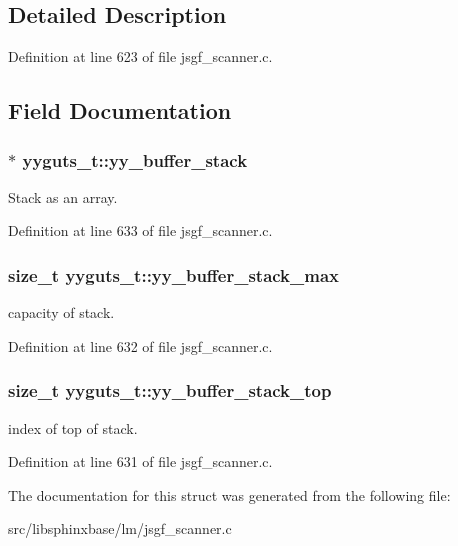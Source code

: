 \subsection{Detailed Description}


Definition at line 623 of file jsgf\-\_\-scanner.\-c.



\subsection{Field Documentation}
\subsubsection[{yy\-\_\-buffer\-\_\-stack}]{$\ast$ yyguts\-\_\-t\-::yy\-\_\-buffer\-\_\-stack}\label{structyyguts__t_ad0b9d576189d518a4482f20ed9b2a416}


Stack as an array. 



Definition at line 633 of file jsgf\-\_\-scanner.\-c.

\subsubsection[{yy\-\_\-buffer\-\_\-stack\-\_\-max}]{\setlength{\rightskip}{0pt plus 5cm}size\-\_\-t yyguts\-\_\-t\-::yy\-\_\-buffer\-\_\-stack\-\_\-max}\label{structyyguts__t_a4435bb91e87f9988b096afc21386289a}


capacity of stack. 



Definition at line 632 of file jsgf\-\_\-scanner.\-c.

\subsubsection[{yy\-\_\-buffer\-\_\-stack\-\_\-top}]{\setlength{\rightskip}{0pt plus 5cm}size\-\_\-t yyguts\-\_\-t\-::yy\-\_\-buffer\-\_\-stack\-\_\-top}\label{structyyguts__t_af92507d904af2fcd4509acde654a9850}


index of top of stack. 



Definition at line 631 of file jsgf\-\_\-scanner.\-c.



The documentation for this struct was generated from the following file\-:\begin{DoxyCompactItemize}
\item 
src/libsphinxbase/lm/jsgf\-\_\-scanner.\-c\end{DoxyCompactItemize}
